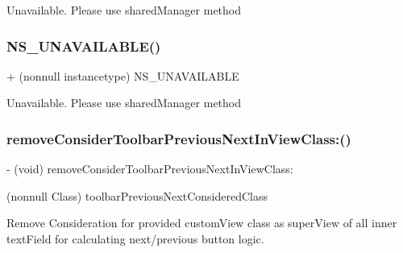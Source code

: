 Unavailable. Please use shared\+Manager method \mbox{\label{interface_i_q_keyboard_manager_a4eb45516efb28bba1b8dd12ba98c9e48}} 
\subsubsection{\texorpdfstring{N\+S\+\_\+\+U\+N\+A\+V\+A\+I\+L\+A\+B\+L\+E()}{NS\_UNAVAILABLE()}\hspace{0.1cm}{\footnotesize\ttfamily [6/6]}}
{\footnotesize\ttfamily + (nonnull instancetype) N\+S\+\_\+\+U\+N\+A\+V\+A\+I\+L\+A\+B\+LE \begin{DoxyParamCaption}{ }\end{DoxyParamCaption}}

Unavailable. Please use shared\+Manager method \mbox{\label{interface_i_q_keyboard_manager_acd8d803c2aaaeab1204c709d81875a26}} 
\subsubsection{\texorpdfstring{remove\+Consider\+Toolbar\+Previous\+Next\+In\+View\+Class\+:()}{removeConsiderToolbarPreviousNextInViewClass:()}\hspace{0.1cm}{\footnotesize\ttfamily [1/3]}}
{\footnotesize\ttfamily -\/ (void) remove\+Consider\+Toolbar\+Previous\+Next\+In\+View\+Class\+: \begin{DoxyParamCaption}\item[{(nonnull Class)}]{toolbar\+Previous\+Next\+Considered\+Class }\end{DoxyParamCaption}}

Remove Consideration for provided custom\+View class as super\+View of all inner text\+Field for calculating next/previous button logic.



